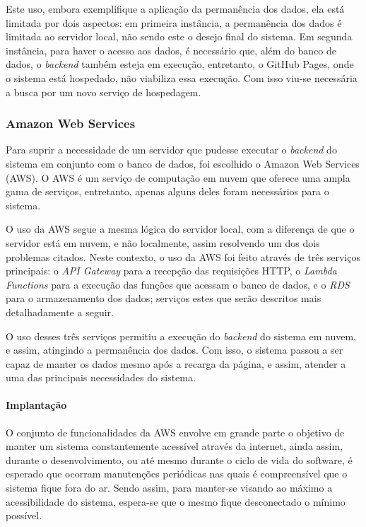 Este uso, embora exemplifique a aplicação da permanência dos dados, ela está limitada por dois aspectos: em primeira instância, a permanência dos dados é limitada ao servidor local, não sendo este o desejo final do sistema. Em segunda instância, para haver o acesso aos dados, é necessário que, além do banco de dados, o \textit{backend} também esteja em execução, entretanto, o GitHub Pages, onde o sistema está hospedado, não viabiliza essa execução. Com isso viu-se necessária a busca por um novo serviço de hospedagem.

\subsubsection{Amazon Web Services}

Para suprir a necessidade de um servidor que pudesse executar o \textit{backend} do sistema em conjunto com o banco de dados, foi escolhido o Amazon Web Services (AWS). O AWS é um serviço de computação em nuvem que oferece uma ampla gama de serviços, entretanto, apenas alguns deles foram necessários para o sistema.

O uso da AWS segue a mesma lógica do servidor local, com a diferença de que o servidor está em nuvem, e não localmente, assim resolvendo um dos dois problemas citados. Neste contexto, o uso da AWS foi feito através de três serviços principais: o \textit{API Gateway} para a recepção das requisições HTTP, o \textit{Lambda Functions} para a execução das funções que acessam o banco de dados, e o \textit{RDS} para o armazenamento dos dados; serviços estes que serão descritos mais detalhadamente a seguir.

O uso desses três serviços permitiu a execução do \textit{backend} do sistema em nuvem, e assim, atingindo a permanência dos dados. Com isso, o sistema passou a ser capaz de manter os dados mesmo após a recarga da página, e assim, atender a uma das principais necessidades do sistema.


\paragraph*{Implantação}

O conjunto de funcionalidades da AWS envolve em grande parte o objetivo de manter um sistema constantemente acessível através da internet, ainda assim, durante o desenvolvimento, ou até mesmo durante o ciclo de vida do software, é esperado que ocorram manutenções periódicas nas quais é compreensível que o sistema fique fora do ar. Sendo assim, para manter-se visando ao máximo a acessibilidade do sistema, espera-se que o mesmo fique desconectado o mínimo possível.


